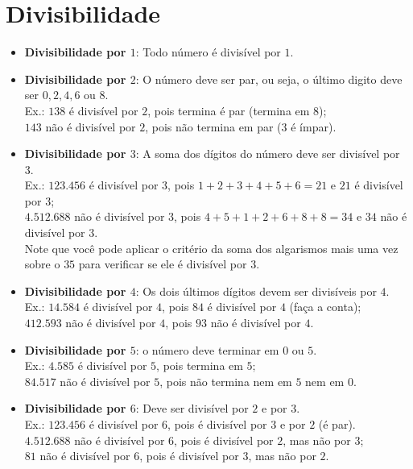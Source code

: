 \documentclass[12pt]{report}
\newcommand{\1}{\faThermometerEmpty}
\newcommand{\2}{\faThermometerQuarter}
\newcommand{\3}{\faThermometerHalf}
\newcommand{\4}{\faThermometerThreeQuarters}
\newcommand{\5}{\faThermometerFull}
\begin{document}
\section*{Divisibilidade}
\begin{itemize}
    \item \textbf{Divisibilidade por $1$}: Todo número é divisível por $1$.
    
    \item \textbf{Divisibilidade por $2$}: O número deve ser par, ou seja, o último digito deve ser $0,2,4,6$ ou $8$. \\
    Ex.: $138$ é divisível por $2$, pois termina é par (termina em $8$);\\
    \phantom{Ex.: }$143$ não é divisível por $2$, pois não termina em par ($3$ é ímpar).
    
    \item \textbf{Divisibilidade por $3$}: A soma dos dígitos do número deve ser divisível por 3. \\
    Ex.: $123.456$ é divisível por $3$, pois $1+2+3+4+5+6=21$ e $21$ é divisível por $3$; \\
    \phantom{Ex.: }$4.512.688$ não é divisível por $3$, pois $4+5+1+2+6+8+8=34$ e $34$ não é divisível por $3$. \\
    Note que você pode aplicar o critério da soma dos algarismos mais uma vez sobre o $35$ para verificar se ele é divisível por $3$.
    
    \item \textbf{Divisibilidade por $4$}: Os dois últimos dígitos devem ser divisíveis por $4$.\\
    Ex.: $14.584$ é divisível por $4$, pois $84$ é divisível por $4$ (faça a conta);\\
    \phantom{Ex.: }$412.593$ não é divisível por $4$, pois $93$ não é divisível por $4$.
    
    \item \textbf{Divisibilidade por $5$}: o número deve terminar em $0$ ou $5$.\\
    Ex.:  $4.585$ é divisível por $5$, pois termina em $5$;\\
    \phantom{Ex.: }$84.517$ não é divisível por $5$, pois não termina nem em $5$ nem em $0$.
   
    \item \textbf{Divisibilidade por $6$}: Deve ser divisível por $2$ e por $3$.\\
    Ex.: $123.456$ é divisível por $6$, pois é divisível por $3$ e por $2$ (é par).\\
    \phantom{Ex.: }$4.512.688$ não é divisível por $6$, pois é divisível por $2$, mas não por $3$;\\
    \phantom{Ex.: }$81$ não é divisível por $6$, pois é divisível por $3$, mas não por $2$.\\
    

\end{itemize}
\end{document}

